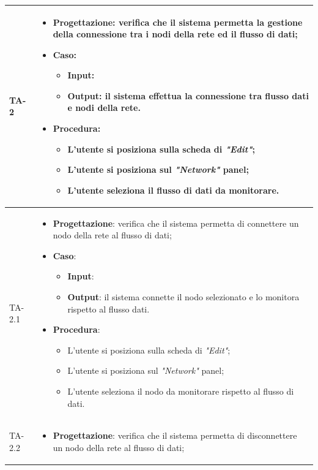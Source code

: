 \begin{longtable}{|C{2.5cm}|C{13cm}|}
{TA-2} &
\begin{itemize}
	\item \textbf{Progettazione}: verifica che il sistema permetta la gestione della connessione tra i nodi della rete ed il flusso di dati;
	\item \textbf{Caso}: 
	\begin{itemize}
		\item \textbf{Input}:
		\item \textbf{Output}: il sistema effettua la connessione tra flusso dati e nodi della rete.
	\end{itemize}
	\item \textbf{Procedura}:
	\begin{itemize}
		\item L'utente si posiziona sulla scheda di \emph{"Edit"};
		\item L'utente si posiziona sul \emph{"Network"} panel;
		\item L'utente seleziona il flusso di dati da monitorare.
	\end{itemize} 
\end{itemize} \\
 \hline
{TA-2.1} &
\begin{itemize}
	\item \textbf{Progettazione}: verifica che il sistema permetta di connettere un nodo della rete al flusso di dati;
	\item \textbf{Caso}: 
	\begin{itemize}
		\item \textbf{Input}: 
		\item \textbf{Output}: il sistema connette il nodo selezionato e lo monitora rispetto al flusso dati.
	\end{itemize}
	\item \textbf{Procedura}:
	\begin{itemize}
		\item L'utente si posiziona sulla scheda di \emph{"Edit"};
		\item L'utente si posiziona sul \emph{"Network"} panel;
		\item L'utente seleziona il nodo da monitorare rispetto al flusso di dati.
	\end{itemize} 
\end{itemize} \\
\hline
{TA-2.2} &
\begin{itemize}
	\item \textbf{Progettazione}: verifica che il sistema permetta di disconnettere un nodo della rete al flusso di dati;

\end{itemize}
\end{longtable}
